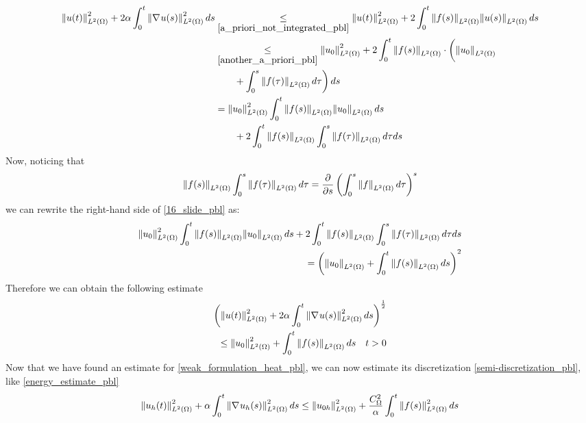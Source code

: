 \begin{equation}
    \begin{aligned}
        \norm{u(t)}_{L^2(\Omega)}^2 + 2\alpha \int_0^t \norm{\nabla\mspace{1mu} u(s)}_{L^2(\Omega)}^2 \, ds 
        &\underset{\eqref{a_priori_not_integrated_pbl}}{\leq} \norm{u(t)}_{L^2(\Omega)}^2 + 2\int_0^t \norm{f(s)}_{L^2(\Omega)}\norm{u(s)}_{L^2(\Omega)} \, ds \\
        &\underset{\eqref{another_a_priori_pbl}}{\leq} \norm{u_0}_{L^2(\Omega)}^2 + 2\int_0^t \norm{f(s)}_{L^2(\Omega)} \cdot \bigg( \norm{u_0}_{L^2(\Omega)} \\
        &\qquad + \int_0^s \norm{f(\tau)}_{L^2(\Omega)} \, d\tau \bigg) \, ds \\
        &= \norm{u_0}_{L^2(\Omega)}^2 \int_0^t \norm{f(s)}_{L^2(\Omega)}\norm{u_0}_{L^2(\Omega)}\, ds \\
        &\qquad+ 2 \int_0^t \norm{f(s)}_{L^2(\Omega)}\int_0^s \norm{f(\tau)}_{L^2(\Omega)} \, d\tau ds
    \end{aligned}
    \label{16_slide_pbl}
\end{equation}
Now, noticing that 
\[
    \ltwonorm{f(s)} \int_0^s \ltwonorm{f(\tau)} \, d\tau = \pderivative{s} \left( \int_0^s \ltwonorm{f} \, d\tau \right)^s
\]
we can rewrite the right-hand side of \eqref{16_slide_pbl} as:
\begin{equation*}
    \begin{split}
        \norm{u_0}_{L^2(\Omega)}^2 \int_0^t \norm{f(s)}_{L^2(\Omega)}\norm{u_0}_{L^2(\Omega)}\, ds+ 2 \int_0^t \norm{f(s)}_{L^2(\Omega)}\int_0^s \norm{f(\tau)}_{L^2(\Omega)} \, d\tau ds \\
        = \left( \norm{u_0}_{L^2(\Omega)} +\int_0^t \norm{f(s)}_{L^2(\Omega)} \, ds \right)^2
    \end{split}
\end{equation*}
Therefore we can obtain the following estimate 
\begin{equation}
    \begin{split}
        \left( \norm{u(t)}_{L^2(\Omega)}^2 + 2\alpha \int_0^t \norm{\nabla\mspace{1mu} u(s)}_{L^2(\Omega)}^2 \, ds \right)^{\frac{1}{2}} \\
        \leq \norm{u_0}_{L^2(\Omega)}^2 + \int_0^t \norm{f(s)}_{L^2(\Omega)} \, ds \quad t >0
    \end{split}
    \label{hopefully_last_estimate_pbl}
\end{equation}
Now that we have found an estimate for \eqref{weak_formulation_heat_pbl}, we can now estimate its discretization \eqref{semi-discretization_pbl}, like \eqref{energy_estimate_pbl}
\begin{equation}
    \norm{u_h(t)}_{L^2(\Omega)}^2 +\alpha \int_0^t \norm{\nabla\mspace{1mu} u_h(s)}_{L^2(\Omega)}^2 \, ds \leq \norm{u_{0h}}_{L^2(\Omega)}^2 + \frac{C_\Omega^2}{\alpha} \int_0^t \norm{f(s)}_{L^2(\Omega)}^2 \, ds
    \label{energy_est_galerkin_pbl}
\end{equation}
